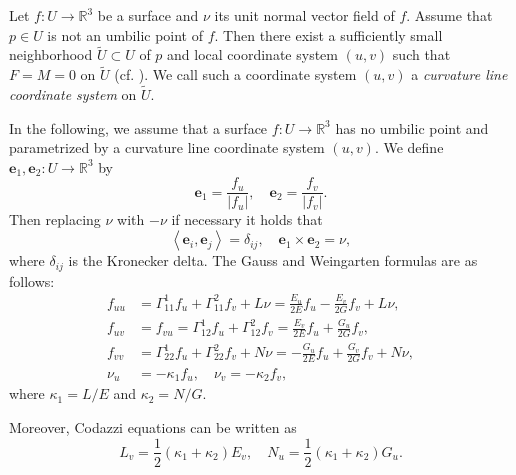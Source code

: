 \documentclass[11pt,a4paper,pdflatex,final]{amsart}
\theoremstyle{plain}
\theoremstyle{definition}
\theoremstyle{remark}
\newcommand{\0}{\bm{0}}
\newcommand{\R}{\mathbb{R}}
\newcommand{\be}{\bm{e}}
\newcommand{\til}{\tilde}
\newcommand{\inner}[2]{\left\langle{#1},{#2}\right\rangle}
\numberwithin{equation}{section}
\begin{document}
{Let $f\colon U\to\R^3$ be a surface and $\nu$ its unit normal vector field of $f$. 
Assume that $p\in U$ is not an umbilic point of $f$. 
Then there exist a sufficiently small neighborhood $\til{U}\subset U$ of $p$ 
and local coordinate system $(u,v)$ such that 
$F=M=0$ on $\til{U}$ (cf. \cite[page 188]{carmo}). 
We call such a coordinate system $(u,v)$ a \textit{curvature line coordinate system} on $\til{U}$. 

In the following, we assume that a surface $f\colon U\to\R^3$ has no umbilic point 
and parametrized by a curvature line coordinate system $(u,v)$. 
We define $\be_1,\be_2\colon U\to\R^3$ by 
\begin{equation}\label{eq:frame}
	\be_1=\frac{f_u}{|f_u|},\quad 
	\be_2=\frac{f_v}{|f_v|}.
\end{equation}
Then replacing $\nu$ with $-\nu$ if necessary 
it holds that 
\[
\inner{\be_i}{\be_j}=\delta_{ij},\quad 
\be_1\times \be_2=\nu,
\]
where $\delta_{ij}$ is the Kronecker delta. 
The Gauss and Weingarten formulas are as follows: 
\begin{equation}\label{eq:gauss}
	\begin{aligned}
		f_{uu}&=\Gamma^{1}_{11}f_u+\Gamma^{2}_{11}f_v+L\nu
		=\frac{E_u}{2E}f_u - \frac{E_v}{2G}f_v+L\nu,\\
		f_{uv}&=f_{vu}=\Gamma^{1}_{12}f_u+\Gamma^{2}_{12}f_v
		=\frac{E_v}{2E}f_u+\frac{G_u}{2G}f_v,\\
		f_{vv}&=\Gamma^{1}_{22}f_u+\Gamma^{2}_{22}f_v+N\nu
		=-\frac{G_u}{2E}f_u+\frac{G_v}{2G}f_v+N\nu,\\
		\nu_u&=-\kappa_1f_u,\quad 
		\nu_v=-\kappa_2f_v,
	\end{aligned}
\end{equation}
where $\kappa_1=L/E$ and $\kappa_2=N/G$. 
}
Moreover, Codazzi equations can be written as  
\begin{equation}\label{eq:codazzi}
L_v=\frac{1}{2}(\kappa_1+\kappa_2)E_v,\quad 
N_u=\frac{1}{2}(\kappa_1+\kappa_2)G_u.
\end{equation}
\end{document}
